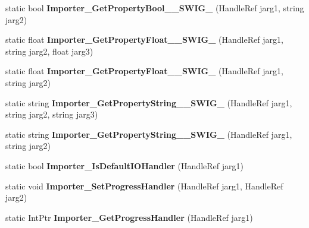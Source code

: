 \begin{DoxyCompactItemize}
\item 
\hypertarget{class_assimp_p_i_n_v_o_k_e_a56221be00a65971031a45b73764c7a1b}{static bool {\bfseries Importer\+\_\+\+Get\+Property\+Bool\+\_\+\+\_\+\+S\+W\+I\+G\+\_} (Handle\+Ref jarg1, string jarg2)}\label{class_assimp_p_i_n_v_o_k_e_a56221be00a65971031a45b73764c7a1b}

\item 
\hypertarget{class_assimp_p_i_n_v_o_k_e_ac8ca05b675a365453d45427fafa561da}{static float {\bfseries Importer\+\_\+\+Get\+Property\+Float\+\_\+\+\_\+\+S\+W\+I\+G\+\_} (Handle\+Ref jarg1, string jarg2, float jarg3)}\label{class_assimp_p_i_n_v_o_k_e_ac8ca05b675a365453d45427fafa561da}

\item 
\hypertarget{class_assimp_p_i_n_v_o_k_e_ad085a1c54c0a2384eeba2cb22fa88341}{static float {\bfseries Importer\+\_\+\+Get\+Property\+Float\+\_\+\+\_\+\+S\+W\+I\+G\+\_} (Handle\+Ref jarg1, string jarg2)}\label{class_assimp_p_i_n_v_o_k_e_ad085a1c54c0a2384eeba2cb22fa88341}

\item 
\hypertarget{class_assimp_p_i_n_v_o_k_e_a4f05cefd5940149f10d93f02b6a14b0a}{static string {\bfseries Importer\+\_\+\+Get\+Property\+String\+\_\+\+\_\+\+S\+W\+I\+G\+\_} (Handle\+Ref jarg1, string jarg2, string jarg3)}\label{class_assimp_p_i_n_v_o_k_e_a4f05cefd5940149f10d93f02b6a14b0a}

\item 
\hypertarget{class_assimp_p_i_n_v_o_k_e_a10bb04f4c86f0e0e7611298781822d8e}{static string {\bfseries Importer\+\_\+\+Get\+Property\+String\+\_\+\+\_\+\+S\+W\+I\+G\+\_} (Handle\+Ref jarg1, string jarg2)}\label{class_assimp_p_i_n_v_o_k_e_a10bb04f4c86f0e0e7611298781822d8e}

\item 
\hypertarget{class_assimp_p_i_n_v_o_k_e_a73492554505013b55516aef46c687a18}{static bool {\bfseries Importer\+\_\+\+Is\+Default\+I\+O\+Handler} (Handle\+Ref jarg1)}\label{class_assimp_p_i_n_v_o_k_e_a73492554505013b55516aef46c687a18}

\item 
\hypertarget{class_assimp_p_i_n_v_o_k_e_ade353dcdb21719860432946acbb63ad2}{static void {\bfseries Importer\+\_\+\+Set\+Progress\+Handler} (Handle\+Ref jarg1, Handle\+Ref jarg2)}\label{class_assimp_p_i_n_v_o_k_e_ade353dcdb21719860432946acbb63ad2}

\item 
\hypertarget{class_assimp_p_i_n_v_o_k_e_aa0ce889ebc0a2e89b77c1be8805ccfc0}{static Int\+Ptr {\bfseries Importer\+\_\+\+Get\+Progress\+Handler} (Handle\+Ref jarg1)}\label{class_assimp_p_i_n_v_o_k_e_aa0ce889ebc0a2e89b77c1be8805ccfc0}


\end{DoxyCompactItemize}
